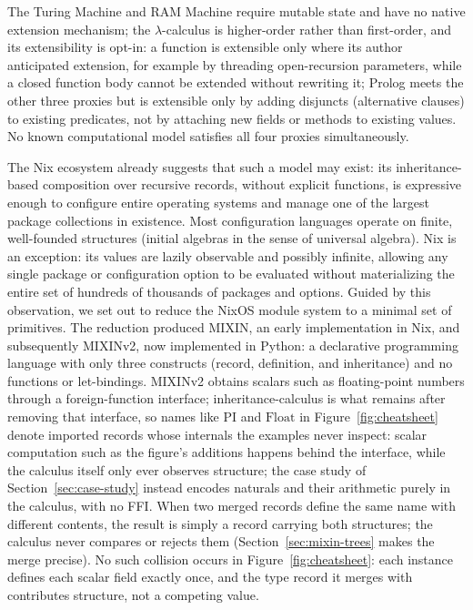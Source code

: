 \noindent
The Turing Machine and RAM Machine require mutable state and have no native
extension mechanism;
the $\lambda$-calculus is higher-order rather than first-order, and its
extensibility is opt-in: a function is extensible only where its author
anticipated extension, for example by threading open-recursion
parameters, while a closed function body cannot be extended without
rewriting it;
Prolog meets the other three proxies but is extensible only by adding
disjuncts (alternative clauses) to existing predicates, not by attaching
new fields or methods to existing values.
No known computational model satisfies all four proxies simultaneously.

The Nix ecosystem already suggests that such a model may exist:
its inheritance-based composition over recursive records, without
explicit functions, is expressive enough to configure entire
operating systems and manage one of the largest package
collections in existence.
Most configuration languages operate on finite, well-founded
structures (initial algebras in the sense of universal algebra).
Nix is an exception: its values are lazily observable
and possibly infinite, allowing any single package or
configuration option to be evaluated without materializing the
entire set of hundreds of thousands of packages and options.
Guided by this observation, we set out to reduce the
NixOS module system to a minimal set of primitives.
The reduction produced MIXIN, an early implementation in Nix,
and subsequently
MIXINv2, now implemented in Python: a declarative programming
language with only three constructs (record, definition,
and inheritance) and no functions or let-bindings.
MIXINv2 obtains scalars such as floating-point numbers through a
foreign-function interface; inheritance-calculus is what remains after
removing that interface, so names like $\mathrm{PI}$ and
$\mathrm{Float}$ in Figure~\ref{fig:cheatsheet} denote imported
records whose internals the examples never inspect: scalar
computation such as the figure's additions happens behind the
interface, while the calculus itself only ever observes structure;
the case study of Section~\ref{sec:case-study} instead encodes
naturals and their arithmetic purely in the calculus, with no FFI.
When two merged records define the same name with different contents,
the result is simply a record carrying both structures; the calculus
never compares or rejects them
(Section~\ref{sec:mixin-trees} makes the merge precise).
No such collision occurs in Figure~\ref{fig:cheatsheet}: each
instance defines each scalar field exactly once, and the type record
it merges with contributes structure, not a competing value.

